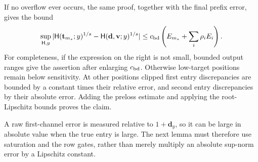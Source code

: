 \documentclass[11pt]{article}
\numberwithin{equation}{section}
\theoremstyle{definition}
\theoremstyle{remark}
\begin{document}
If no overflow ever occurs, the same proof, together with the final prefix
error, gives the bound
\begin{equation}
 \sup_{{\mathsf{H}},y}|{\mathsf{H}}({\mathbf{t}}_{m_*};y)^{1/s}-{\mathsf{H}}({\mathbf{d}},{\mathbf{v}};y)^{1/s}|
       \leq {c_{\rm bd}}\left({E_{m_*}}+\sum_i\rho_i {E_i}\right).
 \label{eq:buf-no-overflow}
\end{equation}
For completeness, if the expression on the right is not small, bounded
output ranges give the assertion after enlarging ${c_{\rm bd}}$.  Otherwise low-target
positions remain below sensitivity.  At other positions clipped first
entry discrepancies are bounded by a constant times their relative error,
and second entry discrepancies by their absolute error.  Adding the
preloss estimate and applying the root-Lipschitz bounds proves the claim.

A raw first-channel error is measured relative to $1+{\mathbf{d}}_y$, so it can be large in absolute value when the true entry is large. The next lemma must therefore use saturation and the row gates, rather than merely multiply an absolute sup-norm error by a Lipschitz constant.
\end{document}

